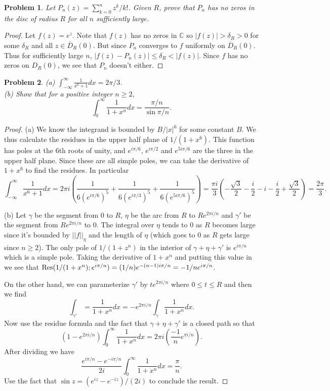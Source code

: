 \documentclass{article}
\newtheorem{problem}{Problem}
\newcommand{\res}{\textup{Res}}
\begin{document}
\begin{problem}
Let $P_n(z) = \sum_{k=0}^n z^k/k!$. Given $R$, prove that $P_n$ has no zeros in the disc of radius $R$ for all $n$ sufficiently large.
\end{problem}
\begin{proof}
Let $f(z) = e^z$. Note that $f(z)$ has no zeros in $\mathbb{C}$ so $|f(z)| > \delta_R > 0$ for some $\delta_R$ and all $z \in \overline{D}_R(0)$. But since $P_n$ converges to $f$ uniformly on $\overline{D}_R(0)$. Thus for sufficiently large $n$, $|f(z) - P_n(z)| \leq \delta_R < |f(z)|$. Since $f$ has no zeros on $D_R(0)$, we see that $P_n$ doesn't either.
\end{proof}

\begin{problem}
(a) $\int_{-\infty}^{\infty} \frac{1}{x^6+1}dx = 2 \pi /3$.\\
(b) Show that for a positive integer $n \geq 2$,
\[
\int_0^{\infty} \frac{1}{1+x^n}dx = \frac{\pi/n}{\sin \pi/n}.
\]
\end{problem}
\begin{proof}
(a) We know the integrand is bounded by $B/|x|^6$ for some constant $B$. We thus calculate the residues in the upper half plane of $1/(1+x^6)$. This function has poles at the $6$th roots of unity, and $e^{i\pi/6}$, $e^{i\pi/2}$ and $e^{5i\pi/6}$ are the three in the upper half plane. Since these are all simple poles, we can take the derivative of $1 + x^6$ to find the residues. In particular
\[
\int_{-\infty}^{\infty} \frac{1}{x^6 + 1}dx = 2 \pi i \left (\frac{1}{6(e^{i\pi/6})^5} + \frac{1}{6(e^{i\pi/3})^5} + \frac{1}{6(e^{5i\pi/6})^5} \right ) = \frac{\pi i}{3} \left ( -\frac{\sqrt{3}}{2} - \frac{i}{2} - i - \frac{i}{2} + \frac{\sqrt{3}}{2} \right ) = \frac{2 \pi}{3}.
\]

(b) Let $\gamma$ be the segment from $0$ to $R$, $\eta$ be the arc from $R$ to $Re^{2 \pi i/n}$ and $\gamma'$ be the segment from $Re^{2 \pi i/n}$ to $0$. The integral over $\eta$ tends to $0$ as $R$ becomes large since it's bounded by $||f||_{\eta}$ and the length of $\eta$ (which goes to $0$ as $R$ gets large since $n \geq 2$). The only pole of $1/(1 + z^n)$ in the interior of $\gamma + \eta + \gamma'$ is $e^{i \pi/n}$ which is a simple pole. Taking the derivative of $1 + x^n$ and putting this value in we see that $\res (1/(1 + x^n) ; e^{i\pi/n}) = (1/n) e^{-(n-1)i\pi/n} = -1/ne^{i\pi/n}$.

On the other hand, we can parameterize $\gamma'$ by $te^{2 \pi i /n}$ where $0 \leq t \leq R$ and then we find
\[
\int_{\gamma'} = \frac{1}{1+x^n}dx = -e^{2 \pi i/n} \int_{\gamma}\frac{1}{1 + x^n}dx.
\]
Now use the residue formula and the fact that $\gamma + \eta + \gamma'$ is a closed path so that
\[
(1 - e^{2 \pi i /n}) \int_{0}^{\infty} \frac{1}{1+x^n}dx = 2 \pi i \left ( \frac{-1}{n}e^{\pi i/n} \right ).
\]
After dividing we have
\[
\frac{e^{i \pi /n} - e^{-i \pi /n}}{2 i} \int_{0}^{\infty} \frac{1}{1+x^n}dx = \frac{\pi}{n}.
\]
Use the fact that $\sin z = (e^{iz} - e^{-iz})/(2i)$ to conclude the result.
\end{proof}
\end{document}
